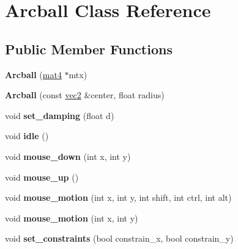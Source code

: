 \hypertarget{classArcball}{\section{Arcball Class Reference}
\label{classArcball}
}
\subsection*{Public Member Functions}
\begin{DoxyCompactItemize}
\item 
\hypertarget{classArcball_a6e87bc32b08b572898cbc39741840b08}{{\bfseries Arcball} (\hyperlink{classmat4}{mat4} $\ast$mtx)}\label{classArcball_a6e87bc32b08b572898cbc39741840b08}

\item 
\hypertarget{classArcball_a3eeaf68e1983e08a53ae1f939aaab998}{{\bfseries Arcball} (const \hyperlink{classvec2}{vec2} \&center, float radius)}\label{classArcball_a3eeaf68e1983e08a53ae1f939aaab998}

\item 
\hypertarget{classArcball_a88a31d0e9b94ec8640d350f6645f3678}{void {\bfseries set\-\_\-damping} (float d)}\label{classArcball_a88a31d0e9b94ec8640d350f6645f3678}

\item 
\hypertarget{classArcball_a2d4725a29ba1e6542ead0aeaf8e818d7}{void {\bfseries idle} ()}\label{classArcball_a2d4725a29ba1e6542ead0aeaf8e818d7}

\item 
\hypertarget{classArcball_af68551c34a6a63f9e3ecf7995fff82ad}{void {\bfseries mouse\-\_\-down} (int x, int y)}\label{classArcball_af68551c34a6a63f9e3ecf7995fff82ad}

\item 
\hypertarget{classArcball_aca28da4e0270a68b248a58a9605056c6}{void {\bfseries mouse\-\_\-up} ()}\label{classArcball_aca28da4e0270a68b248a58a9605056c6}

\item 
\hypertarget{classArcball_a548ddff008dfd260069329ad14c988f2}{void {\bfseries mouse\-\_\-motion} (int x, int y, int shift, int ctrl, int alt)}\label{classArcball_a548ddff008dfd260069329ad14c988f2}

\item 
\hypertarget{classArcball_ab6c81c8ebfeb0624e4f5998a8bdf4d93}{void {\bfseries mouse\-\_\-motion} (int x, int y)}\label{classArcball_ab6c81c8ebfeb0624e4f5998a8bdf4d93}

\item 
\hypertarget{classArcball_a9217b887f7995b0c2c4bb4aaca2724e7}{void {\bfseries set\-\_\-constraints} (bool constrain\-\_\-x, bool constrain\-\_\-y)}\label{classArcball_a9217b887f7995b0c2c4bb4aaca2724e7}


\end{DoxyCompactItemize}
